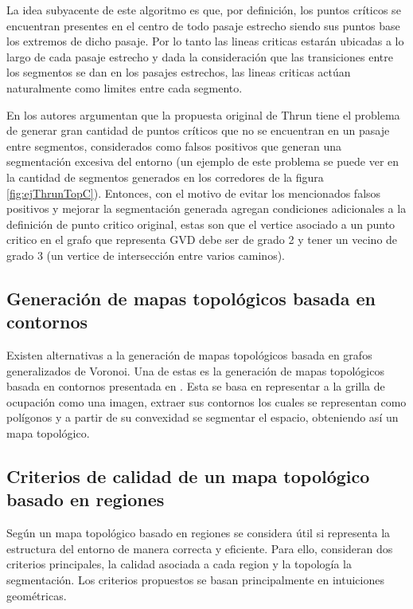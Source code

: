 La idea subyacente de este algoritmo es que, por definición, los puntos críticos se encuentran presentes en el centro de todo pasaje estrecho siendo sus puntos base los extremos de dicho pasaje. Por lo tanto las lineas criticas estarán ubicadas a lo largo de cada pasaje estrecho y dada la consideración que las transiciones entre los segmentos se dan en los pasajes estrechos, las lineas criticas actúan naturalmente como limites entre cada segmento.


En \cite{wurm2008coordinated} los autores argumentan que la propuesta original de Thrun tiene el problema de generar gran cantidad de puntos críticos que no se encuentran en un pasaje entre segmentos, considerados como falsos positivos que generan una segmentación excesiva del entorno (un ejemplo de este problema se puede ver en la cantidad de segmentos generados en los corredores de la figura \ref{fig:ejThrunTopC}). Entonces, con el motivo de evitar los mencionados falsos positivos y mejorar la segmentación generada agregan condiciones adicionales a la definición de punto critico original, estas son que el vertice asociado a un punto critico en el grafo que representa GVD debe ser de grado 2 y tener un vecino de grado 3 (un vertice de intersección entre varios caminos). 

\subsection[Generación de mapas topológicos basada en contornos]{Generación de mapas topológicos basada en\\ contornos}
Existen alternativas a la generación de mapas topológicos basada en grafos generalizados de Voronoi. Una de estas es la generación de mapas topológicos basada en contornos presentada en \cite{Fermin-Leon2017}. Esta se basa en representar a la grilla de ocupación como una imagen, extraer sus contornos los cuales se representan como polígonos y a partir de su convexidad se segmentar el espacio, obteniendo así un mapa topológico.

\subsection{Criterios de calidad de un mapa topológico basado en regiones}
Según \cite{Liu2015} un mapa topológico basado en regiones se considera útil si representa la estructura del entorno de manera correcta y eficiente. Para ello, consideran dos criterios principales, la calidad asociada a cada region y la topología la segmentación. Los criterios propuestos se basan principalmente en intuiciones geométricas. 

